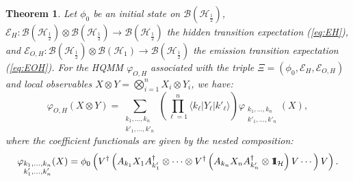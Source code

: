 \documentclass[12pt,a4paper]{article}
\newtheorem{theorem}{Theorem}[section]
\def\id{{\bf 1}\!\!{\rm I}}
\begin{document}
\begin{theorem}\label{thm:main1}
Let $\phi_0$ be an initial state on $\mathcal{B}(\mathcal{H}_{\frac{1}{2}})$, $\mathcal{E}_H: \mathcal{B}(\mathcal{H}_{\frac{1}{2}})\otimes \mathcal{B}(\mathcal{H}_{\frac{1}{2}})\to \mathcal{B}(\mathcal{H}_{\frac{1}{2}})$ the hidden transition expectation (\ref{eq:EH}), and $\mathcal{E}_{O,H}: \mathcal{B}(\mathcal{H}_{\frac{1}{2}})\otimes \mathcal{B}(\mathcal{H}_{1})\to \mathcal{B}(\mathcal{H}_{\frac{1}{2}})$ the emission transition expectation (\ref{eq:EOH}). For the HQMM $\varphi_{O,H}$ associated with the triple $\Xi = (\phi_0, \mathcal{E}_H, \mathcal{E}_{O,H})$ and local observables $X \otimes Y = \bigotimes_{i=1}^{n} X_i \otimes Y_i$, we have:
\begin{equation}\label{eq_phiOH}
\varphi_{O,H}(X \otimes Y) = \sum_{\substack{k_1,\dots,k_n \\ k'_1,\dots,k'_n}} \left( \prod_{\ell=1}^n \langle k_\ell | Y_\ell | k'_\ell \rangle \right) \varphi_{\substack{k_1,\dots,k_n \\ k'_1,\dots,k'_n}}(X),
\end{equation}
where the coefficient functionals are given by the nested composition:
\begin{equation}\label{eq:coefE_func}
\varphi_{\substack{k_1,\dots,k_n \\ k'_1,\dots,k'_n}}(X) = \phi_0 \left( V^{\dagger} \left( A_{k_1}X_1 A_{k'_1}^\dagger \otimes  \cdots \otimes V^{\dagger}\left( A_{k_n}X_n A_{k'_n}^\dagger \otimes \id_{\mathcal{H}} \right)V \cdots \right)V \right).
\end{equation}
\end{theorem}
\end{document}
